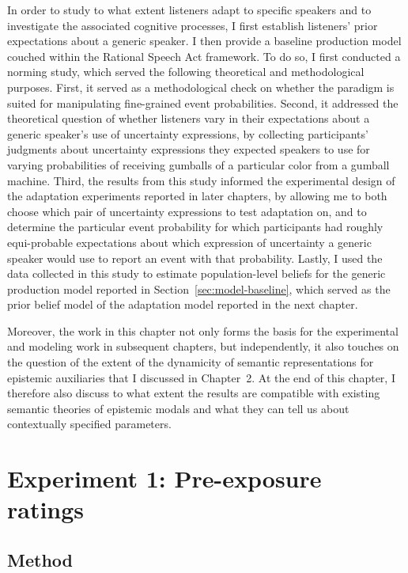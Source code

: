 In order to study to what extent listeners adapt to specific speakers and to investigate the associated cognitive processes, 
I first establish
listeners' prior expectations about a generic speaker. I then provide a baseline production model couched within the Rational Speech Act framework.
To do so, I first conducted a norming study, which served the following theoretical and methodological purposes.
First, it served as a methodological check on whether the paradigm is suited for 
manipulating fine-grained event probabilities. 
Second, it addressed the theoretical question of whether listeners vary in their expectations about
a generic speaker's use of uncertainty expressions, by collecting participants' judgments about 
uncertainty expressions they expected speakers to use for varying probabilities of receiving gumballs of a particular color from a gumball machine. 
Third,  the results from this study informed the experimental design of the adaptation experiments 
reported in later chapters, by allowing me to both choose which pair of uncertainty expressions to test adaptation on, 
and to determine the particular event probability for which participants had roughly equi-probable expectations 
about which expression of uncertainty a generic speaker would use to report an event with that probability. 
Lastly, I used the data collected in this study to 
estimate population-level beliefs for the generic production model reported in 
Section~\ref{sec:model-baseline}, which served as the prior belief model of the
adaptation model reported in the next chapter.

Moreover, the work in this chapter not only forms the basis for the experimental and modeling work in subsequent chapters,
but independently, it also touches on the question of the extent of the dynamicity of semantic representations for epistemic auxiliaries 
 that I discussed in Chapter~2. At the end of this
chapter, I therefore also discuss to what extent the results are compatible with existing semantic theories of epistemic modals
and what they can tell us about contextually specified parameters. 


\section{Experiment 1: Pre-exposure ratings}
\label{sec:exp-norming}

\subsection{Method}

